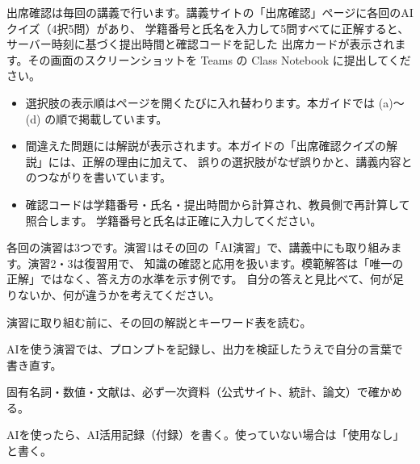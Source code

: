 出席確認は毎回の講義で行います。講義サイトの「出席確認」ページに各回のAIクイズ（4択5問）があり、
学籍番号と氏名を入力して5問すべてに正解すると、サーバー時刻に基づく提出時間と確認コードを記した
出席カードが表示されます。その画面のスクリーンショットを Teams の Class Notebook に提出してください。
\begin{itemize}
  \item 選択肢の表示順はページを開くたびに入れ替わります。本ガイドでは (a)〜(d) の順で掲載しています。
  \item 間違えた問題には解説が表示されます。本ガイドの「出席確認クイズの解説」には、正解の理由に加えて、
        誤りの選択肢がなぜ誤りかと、講義内容とのつながりを書いています。
  \item 確認コードは学籍番号・氏名・提出時間から計算され、教員側で再計算して照合します。
        学籍番号と氏名は正確に入力してください。
\end{itemize}

各回の演習は3つです。演習1はその回の「AI演習」で、講義中にも取り組みます。演習2・3は復習用で、
知識の確認と応用を扱います。模範解答は「唯一の正解」ではなく、答え方の水準を示す例です。
自分の答えと見比べて、何が足りないか、何が違うかを考えてください。
\begin{checks}
  \item 演習に取り組む前に、その回の解説とキーワード表を読む。
  \item AIを使う演習では、プロンプトを記録し、出力を検証したうえで自分の言葉で書き直す。
  \item 固有名詞・数値・文献は、必ず一次資料（公式サイト、統計、論文）で確かめる。
  \item AIを使ったら、AI活用記録（付録）を書く。使っていない場合は「使用なし」と書く。
\end{checks}
